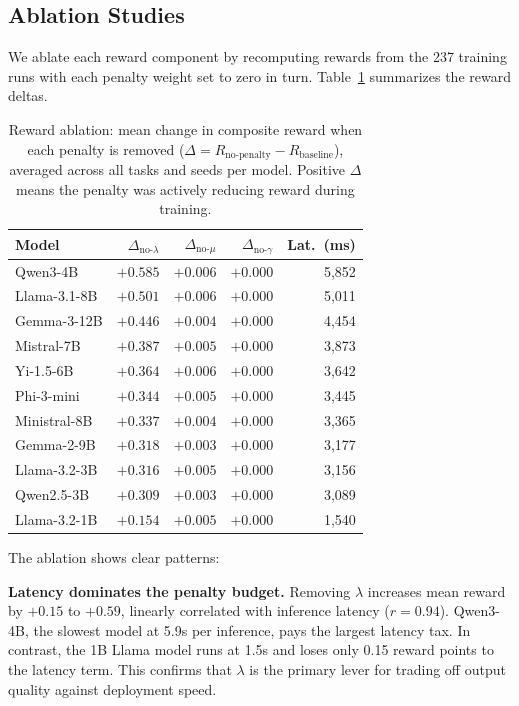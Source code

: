 \documentclass[11pt]{article}
\begin{document}
\subsection{Ablation Studies}
\label{sec:ablation}

We ablate each reward component by recomputing rewards from the 237 training runs with each penalty weight set to zero in turn.  Table~\ref{tab:ablation} summarizes the reward deltas.

\begin{table}[t]
\centering
\caption{Reward ablation: mean change in composite reward when each penalty is removed ($\Delta = R_{\text{no-penalty}} - R_{\text{baseline}}$), averaged across all tasks and seeds per model.  Positive $\Delta$ means the penalty was actively reducing reward during training.}
\label{tab:ablation}
\begin{tabular}{@{}l r r r r@{}}
\toprule
\textbf{Model} & $\Delta_{\text{no-}\lambda}$ & $\Delta_{\text{no-}\mu}$ & $\Delta_{\text{no-}\gamma}$ & \textbf{Lat.\ (ms)} \\
\midrule
Qwen3-4B      & $+0.585$ & $+0.006$ & $+0.000$ & 5{,}852 \\
Llama-3.1-8B  & $+0.501$ & $+0.006$ & $+0.000$ & 5{,}011 \\
Gemma-3-12B   & $+0.446$ & $+0.004$ & $+0.000$ & 4{,}454 \\
Mistral-7B    & $+0.387$ & $+0.005$ & $+0.000$ & 3{,}873 \\
Yi-1.5-6B     & $+0.364$ & $+0.006$ & $+0.000$ & 3{,}642 \\
Phi-3-mini    & $+0.344$ & $+0.005$ & $+0.000$ & 3{,}445 \\
Ministral-8B  & $+0.337$ & $+0.004$ & $+0.000$ & 3{,}365 \\
Gemma-2-9B    & $+0.318$ & $+0.003$ & $+0.000$ & 3{,}177 \\
Llama-3.2-3B  & $+0.316$ & $+0.005$ & $+0.000$ & 3{,}156 \\
Qwen2.5-3B    & $+0.309$ & $+0.003$ & $+0.000$ & 3{,}089 \\
Llama-3.2-1B  & $+0.154$ & $+0.005$ & $+0.000$ & 1{,}540 \\
\bottomrule
\end{tabular}
\end{table}

The ablation shows clear patterns:

\textbf{Latency dominates the penalty budget.} Removing $\lambda$ increases mean reward by $+0.15$ to $+0.59$, linearly correlated with inference latency ($r = 0.94$).  Qwen3-4B, the slowest model at 5.9s per inference, pays the largest latency tax.  In contrast, the 1B Llama model runs at 1.5s and loses only 0.15 reward points to the latency term.  This confirms that $\lambda$ is the primary lever for trading off output quality against deployment speed.
\end{document}
